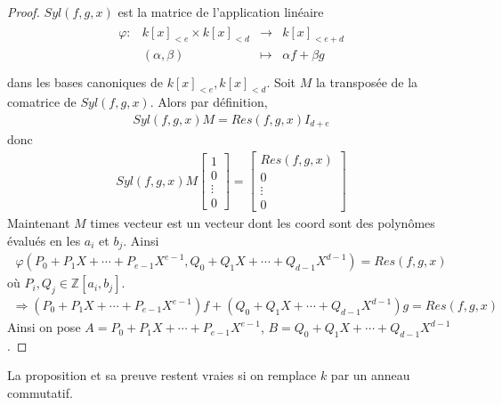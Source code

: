                \begin{proof}
                    $Syl(f,g,x)$ est la matrice de l'application linéaire 
                    \begin{align*}
                        \begin{array}{cccc}
                            \varphi : & k[x]_{<e} \times k[x]_{<d} & \to & k[x]_{<e + d}\\
                            & (\alpha, \beta) & \mapsto & \alpha f + \beta g \\
                        \end{array}
                    \end{align*}
                    dans les bases canoniques de $k[x]_{<e}, k[x]_{<d}$. Soit $M$ la transposée de la comatrice de $Syl(f,g,x)$. Alors par définition,
                    \begin{align*}
                        Syl(f,g,x) M = Res(f,g,x) I_{d+e}
                    \end{align*}
                    donc
                    \begin{align*}
                        Syl(f,g,x) M \begin{bmatrix} 1 \\ 0 \\ \vdots \\ 0 \end{bmatrix} = \begin{bmatrix} Res(f,g,x) \\ 0 \\ \vdots \\ 0 \end{bmatrix}
                    \end{align*}
                    Maintenant $M$ times vecteur est un vecteur dont les coord sont des polynômes évalués en les $a_i$ et $b_j$. Ainsi
                    \begin{align*}
                        \varphi(P_0 + P_1X + \cdots + P_{e-1}X^{e-1}, Q_0 + Q_1X + \cdots + Q_{d-1}X^{d-1}) = Res(f,g,x)
                    \end{align*}
                    où $P_i, Q_j \in \mathbb{Z}[a_i, b_j]$. 
                    \begin{align*}
                        \Rightarrow (P_0 + P_1X + \cdots + P_{e-1}X^{e-1}) f + (Q_0 + Q_1X + \cdots + Q_{d-1}X^{d-1}) g = Res(f,g,x)
                    \end{align*}
                    Ainsi on pose $A = P_0 + P_1X + \cdots + P_{e-1}X^{e-1}$, $B = Q_0 + Q_1X + \cdots + Q_{d-1}X^{d-1}$.
                \end{proof}
                \begin{remq}
                    La proposition et sa preuve restent vraies si on remplace $k$ par un anneau commutatif.
                \end{remq}
            

